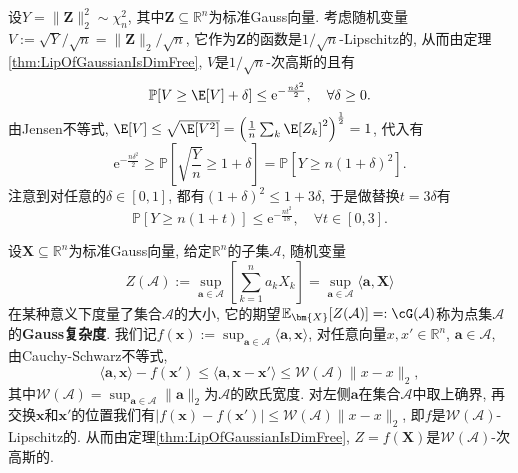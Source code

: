 \begin{example}\label{ex:tailBdofChiSquare}
	设$Y = \|\bm{Z}\|_2^2 \sim \chi^2_n$, 其中$\bm{Z} \subseteq \mathbb{R}^n$为标准Gauss向量. 
	考虑随机变量$V := \sqrt{Y} / \sqrt{n} = \|\bm{Z}\|_2 / \sqrt{n}$, 它作为$\bm{Z}$的函数是$1/\sqrt{n}$-Lipschitz的, 从而由定理\ref{thm:LipOfGaussianIsDimFree}, $V$是$1/\sqrt{n}$-次高斯的且有 
	\begin{equation*}
		\mathbb{P}[V \geq \E[V] + \delta]
		\leq \mathrm{e}^{-\frac{n \delta^2}{2}}, 
		\quad \forall \delta \geq 0.
	\end{equation*}
	由Jensen不等式, $\E[V] \leq \sqrt{\E[V^2]} = \left(\frac{1}{n} \sum_k \E[Z_k]^2 \right)^{\frac12} = 1$, 代入有
	\begin{equation*}
		\mathrm{e}^{-\frac{n \delta^2}{2}}
		\geq \mathbb{P}\left[\sqrt{\frac{Y}{n}} \geq 1 + \delta \right]
		= \mathbb{P}\left[Y \geq n(1 + \delta)^2 \right]. 
	\end{equation*}
	注意到对任意的$\delta \in [0,1]$, 都有$(1+\delta)^2 \leq 1+3\delta$, 于是做替换$t = 3\delta$有
	\begin{equation*}
		\mathbb{P}[Y \geq n(1+t)] 
		\leq \mathrm{e}^{- \frac{nt^2}{18}}, \quad \forall t \in [0,3]. 
	\end{equation*}
\end{example}

\begin{example}[点集的Gauss复杂度]\label{ex:GCofPtSet}
	设$\bm{X} \subseteq \mathbb{R}^n$为标准Gauss向量, 给定$\mathbb{R}^n$的子集$\mathcal{A}$, 随机变量
	\begin{equation*}
		Z(\mathcal{A})
		:= \sup_{\bm{a} \in \mathcal{A}} \left[ \sum_{k=1}^n a_k X_k \right]
		= \sup_{\bm{a} \in \mathcal{A}} \langle \bm{a}, \bm{X} \rangle
	\end{equation*}
	在某种意义下度量了集合$\mathcal{A}$的大小, 它的期望$\mathbb{E}_{\bm{X}}[Z(\mathcal{A})] =: \cG(\mathcal{A})$称为点集$\mathcal{A}$的\textbf{Gauss复杂度}. 
	我们记$f(\bm{x}) := \sup_{\bm{a} \in \mathcal{A}} \langle \bm{a}, \bm{x} \rangle$, 对任意向量$x, x' \in \mathbb{R}^n$, $\bm{a} \in \mathcal{A}$, 由Cauchy-Schwarz不等式, 
	\begin{equation*}
		\langle \bm{a}, \bm{x} \rangle - f(\bm{x}') 
		\leq \langle \bm{a}, \bm{x} - \bm{x}' \rangle
		\leq \mathcal{W}(\mathcal{A}) \|x - x\|_2, 
	\end{equation*}
	其中$\mathcal{W}(\mathcal{A}) = \sup_{\bm{a} \in \mathcal{A}} \|\bm{a}\|_2$为$\mathcal{A}$的欧氏宽度. 
	对左侧$\bm{a}$在集合$\mathcal{A}$中取上确界, 再交换$\bm{x}$和$\bm{x}'$的位置我们有$|f(\bm{x}) - f(\bm{x}')| \leq \mathcal{W}(\mathcal{A}) \|x - x\|_2$, 即$f$是$\mathcal{W}(\mathcal{A})$-Lipschitz的. 
	从而由定理\ref{thm:LipOfGaussianIsDimFree}, $Z = f(\bm{X})$是$\mathcal{W}(\mathcal{A})$-次高斯的. 
\end{example}

